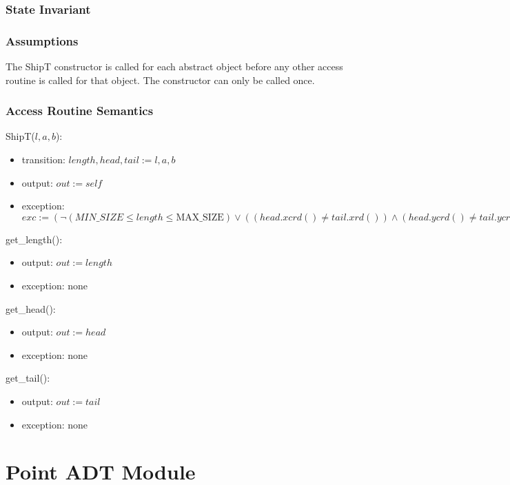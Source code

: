 \documentclass[12pt]{article}
\begin{document}
\subsubsection* {State Invariant}


\subsubsection* {Assumptions}
The ShipT constructor is called for each abstract object before any other access routine is called for that
object.  The constructor can only be called once.

\subsubsection* {Access Routine Semantics}

\noindent ShipT($l, a, b$):
\begin{itemize}
\item transition: $\mathit{length}, \mathit{head}, \mathit{tail} := l, a, b$
\item output: $out := \mathit{self}$
\item exception: $exc := (\lnot (MIN\_SIZE \leq length \leq \mbox{MAX\_SIZE}) \vee ((head.xcrd() \neq tail.xrd()) \land (head.ycrd() \neq tail.ycrd())) \Rightarrow
\mbox{InvalidShipException})$
\end{itemize}

\noindent get\_length():
\begin{itemize}
\item output: $out := length$
\item exception: none
\end{itemize}

\noindent get\_head():
\begin{itemize}
\item output: $out := head$
\item exception: none
\end{itemize}

\noindent get\_tail():
\begin{itemize}
\item output: $out := tail$
\item exception: none
\end{itemize}

\newpage


\section* {Point ADT Module}
\end{document}
